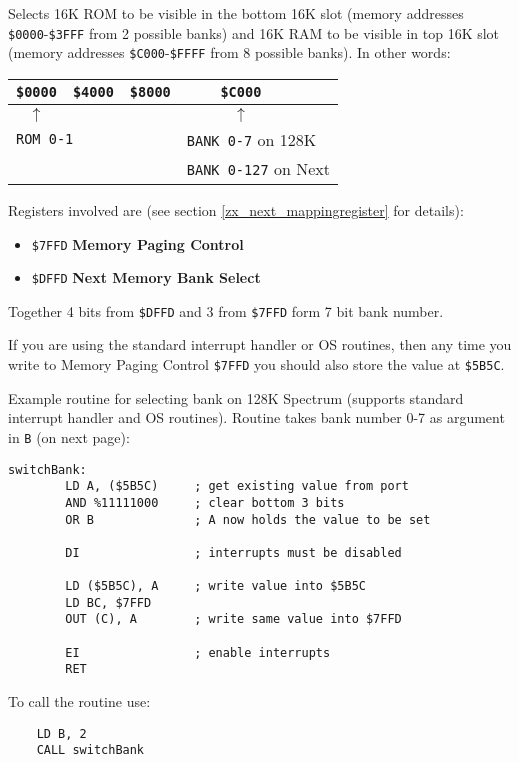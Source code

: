 \documentclass[twoside,openright,a4paper]{book}
\begin{document}
Selects 16K ROM to be visible in the bottom 16K slot (memory addresses {\tt \$0000}-{\tt \$3FFF} from 2 possible banks) and 16K RAM to be visible in top 16K slot (memory addresses {\tt \$C000}-{\tt \$FFFF} from 8 possible banks). In other words:

\begin{tabular}{ccccl}
	{\tt \$0000} & {\tt \$4000} & {\tt \$8000} & {\tt \$C000} & \\
	\hline
	$\uparrow$ & & & $\uparrow$ & \\
	\multicolumn{2}{l}{\tt ROM 0-1} & & \multicolumn{2}{l}{{\tt BANK 0-7} on 128K} \\
	& & & \multicolumn{2}{l}{{\tt BANK 0-127} on Next} \\
\end{tabular}

Registers involved are (see section \ref{zx_next_mappingregister} for details):

\begin{itemize}
	\item {\tt \$7FFD} \textbf{Memory Paging Control}
	\item {\tt \$DFFD} \textbf{Next Memory Bank Select}
\end{itemize}

Together 4 bits from {\tt \$DFFD} and 3 from {\tt \$7FFD} form 7 bit bank number.

If you are using the standard interrupt handler or OS routines, then any time you write to Memory Paging Control {\tt \$7FFD} you should also store the value at {\tt \$5B5C}.

Example routine for selecting bank on 128K Spectrum (supports standard interrupt handler and OS routines). Routine takes bank number 0-7 as argument in {\tt B} (on next page):

\pagebreak
\begin{Verbatim}[gobble=1]
	switchBank:
		LD A, ($5B5C)     ; get existing value from port
		AND %11111000     ; clear bottom 3 bits
		OR B              ; A now holds the value to be set

		DI                ; interrupts must be disabled

		LD ($5B5C), A     ; write value into $5B5C
		LD BC, $7FFD
		OUT (C), A        ; write same value into $7FFD

		EI                ; enable interrupts
		RET
\end{Verbatim}

To call the routine use:

\begin{Verbatim}
	LD B, 2
	CALL switchBank
\end{Verbatim}
\end{document}
